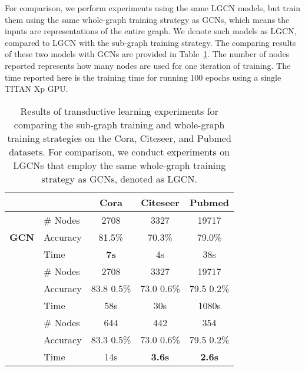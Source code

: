 \documentclass[sigconf]{acmart}
\begin{document}
For comparison, we perform experiments using the same LGCN models,
but train them using the same whole-graph training strategy as GCNs,
which means the inputs are representations of the entire graph. We
denote such models as LGCN, compared to LGCN with
the sub-graph training strategy. The comparing results of these two
models with GCNs are provided in Table~\ref{table:batch_vs_unbatch}.
The number of nodes reported represents how many nodes are used for
one iteration of training. The time reported here is the training
time for running 100 epochs using a single TITAN Xp GPU.


\begin{table}[t]
\centering \caption{Results of transductive learning experiments for
comparing the sub-graph training and whole-graph training strategies
on the Cora, Citeseer, and Pubmed datasets. For comparison, we
conduct experiments on LGCNs that employ the same whole-graph
training strategy as GCNs, denoted as LGCN.}
\label{table:batch_vs_unbatch}
\tabcolsep=0.12cm
\begin{tabular}{  l  l  c  c  c }
    \hline
      &  & \textbf{Cora} & \textbf{Citeseer} & \textbf{Pubmed} \\ \hline\hline
    \multirow{3}{*}{\textbf{GCN}}
      & \# Nodes & 2708 & 3327 & 19717 \\ \cline{2-5}
      & Accuracy   & 81.5\% & 70.3\% & 79.0\% \\ \cline{2-5}
      & Time       & \textbf{7s} & 4s & 38s \\ \hline\hline
    \multirow{3}{*}{}
      & \# Nodes & 2708 & 3327 & 19717 \\ \cline{2-5}
      & Accuracy   & 83.8  0.5\% & 73.0  0.6\% & 79.5  0.2\% \\ \cline{2-5}
      & Time       & 58s & 30s & 1080s \\ \hline\hline
    \multirow{3}{*}{}
      & \# Nodes & 644 & 442 & 354 \\ \cline{2-5}
      & Accuracy   & 83.3  0.5\% & 73.0  0.6\% & 79.5  0.2\% \\ \cline{2-5}
      & Time       & 14s & \textbf{3.6s} & \textbf{2.6s} \\ \hline
\end{tabular}
\end{table}
\end{document}
